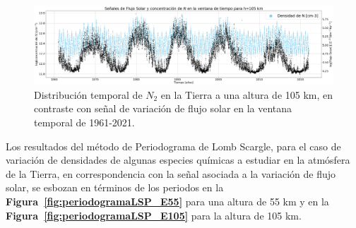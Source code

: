 \documentclass[a4paper,alpha-refs]{eSpectra}
\begin{document}
\begin{figure}
\vspace*{-4mm} %
\centering
	\includegraphics[width=\textwidth, scale=2]{Imagenes/Time_corr_N.png}
    \caption{Distribuci\'on temporal de $N_2$ en la Tierra a una altura de 105 km, en contraste con se\~nal de variaci\'on de flujo solar en la ventana temporal de 1961-2021.}
    \label{fig:Time_corr_N}
\end{figure}



Los resultados del m\'etodo de Periodograma de Lomb Scargle, para el caso de variaci\'on de densidades de algunas especies qu\'imicas a estudiar en la atm\'osfera de la Tierra, en correspondencia con la se\~nal asociada a la variaci\'on de flujo solar, se esbozan en t\'erminos de los periodos en la \textbf{Figura~\ref{fig:periodogramaLSP_E55}} para una altura de 55 km y en la \textbf{Figura~\ref{fig:periodogramaLSP_E105}} para la altura de 105 km.
\end{document}
